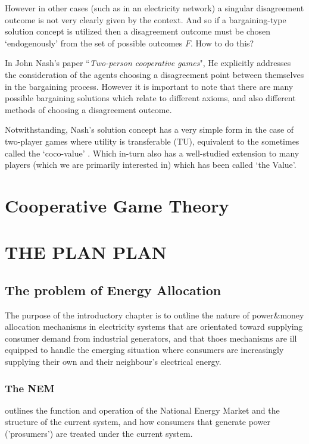 \documentclass{article}
\begin{document}
However in other cases (such as in an electricity network) a singular disagreement outcome is not very clearly given by the context.
And so if a bargaining-type solution concept is utilized then a disagreement outcome must be chosen `endogenously' from the set of possible outcomes $F$.
How to do this?

In John Nash's paper ``\textit{Two-person cooperative games}"\cite{nash2}, He explicitly addresses the consideration of the agents choosing a disagreement point between themselves in the bargaining process. However it is important to note that there are many possible bargaining solutions\cite{smorodinsky,tempered} which relate to different axioms,
 and also different methods of choosing a disagreement outcome.\cite{bozbay,alter_bargaining1,tale1}

Notwithstanding, Nash's solution concept has a very simple form in the case of two-player games where utility is transferable (TU), equivalent to the sometimes called the `coco-value' \cite{kalai1,Kalai2010}.
Which in-turn also has a well-studied extension to many players (which we are primarily interested in) which has been called `the Value'.\cite{values1,values2,values3}


\section{Cooperative Game Theory}




\section{THE PLAN PLAN}


\subsection{The problem of Energy Allocation}
The purpose of the introductory chapter is to outline the nature of power\&money allocation mechanisms in electricity systems that are orientated toward supplying consumer demand from industrial generators, and that thoes mechanisms are ill equipped to handle the emerging situation where consumers are increasingly supplying their own and their neighbour's electrical energy.

\subsubsection{The NEM}
outlines the function and operation of the National Energy Market and the structure of the current system, and how consumers that generate power ('prosumers') are treated under the current system.
\end{document}
